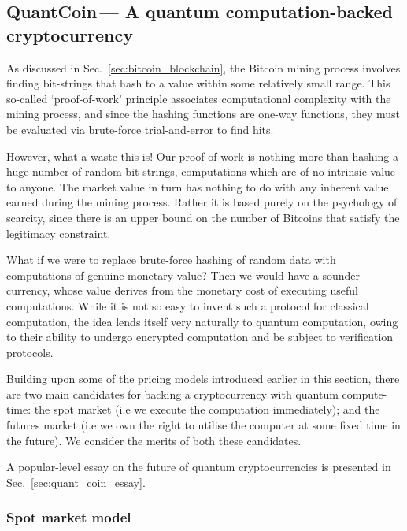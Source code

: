 %
%

\subsection{QuantCoin\texttrademark\,--- A quantum computation-backed cryptocurrency}\label{sec:quant_coin_technical}

As discussed in Sec.~\ref{sec:bitcoin_blockchain}, the Bitcoin mining process involves finding bit-strings that hash to a value within some relatively small range. This so-called `proof-of-work' principle associates computational complexity with the mining process, and since the hashing functions are one-way functions, they must be evaluated via brute-force trial-and-error to find hits.

However, what a waste this is! Our proof-of-work is nothing more than hashing a huge number of random bit-strings, computations which are of no intrinsic value to anyone. The market value in turn has nothing to do with any inherent value earned during the mining process. Rather it is based purely on the psychology of scarcity, since there is an upper bound on the number of Bitcoins that satisfy the legitimacy constraint.

What if we were to replace brute-force hashing of random data with computations of genuine monetary value? Then we would have a sounder currency, whose value derives from the monetary cost of executing useful computations. While it is not so easy to invent such a protocol for classical computation, the idea lends itself very naturally to quantum computation, owing to their ability to undergo encrypted computation and be subject to verification protocols.

Building upon some of the pricing models introduced earlier in this section, there are two main candidates for backing a cryptocurrency with quantum compute-time: the spot market (i.e we execute the computation immediately); and the futures market (i.e we own the right to utilise the computer at some fixed time in the future). We consider the merits of both these candidates.

A popular-level essay on the future of quantum cryptocurrencies is presented in Sec.~\ref{sec:quant_coin_essay}.

%
%

\subsubsection{Spot market model}

